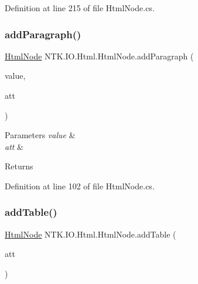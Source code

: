 Definition at line 215 of file Html\+Node.\+cs.

\mbox{\label{class_n_t_k_1_1_i_o_1_1_html_1_1_html_node_ad9f6ff93c1b9ba08233cb84dd6cd1cc2}} 
\subsubsection{\texorpdfstring{addParagraph()}{addParagraph()}}
{\footnotesize\ttfamily \mbox{\hyperlink{class_n_t_k_1_1_i_o_1_1_html_1_1_html_node}{Html\+Node}} N\+T\+K.\+I\+O.\+Html.\+Html\+Node.\+add\+Paragraph (\begin{DoxyParamCaption}\item[{String}]{value,  }\item[{params \mbox{\hyperlink{class_n_t_k_1_1_i_o_1_1_xml_1_1_xml_attribute}{Xml\+Attribute}} \mbox{[}$\,$\mbox{]}}]{att }\end{DoxyParamCaption})}






\begin{DoxyParams}{Parameters}
{\em value} & \\
\hline
{\em att} & \\
\hline
\end{DoxyParams}
\begin{DoxyReturn}{Returns}

\end{DoxyReturn}


Definition at line 102 of file Html\+Node.\+cs.

\mbox{\label{class_n_t_k_1_1_i_o_1_1_html_1_1_html_node_ac104bfc46be493e285abbd554128645d}} 
\subsubsection{\texorpdfstring{addTable()}{addTable()}}
{\footnotesize\ttfamily \mbox{\hyperlink{class_n_t_k_1_1_i_o_1_1_html_1_1_html_node}{Html\+Node}} N\+T\+K.\+I\+O.\+Html.\+Html\+Node.\+add\+Table (\begin{DoxyParamCaption}\item[{params \mbox{\hyperlink{class_n_t_k_1_1_i_o_1_1_xml_1_1_xml_attribute}{Xml\+Attribute}} \mbox{[}$\,$\mbox{]}}]{att }\end{DoxyParamCaption})}






